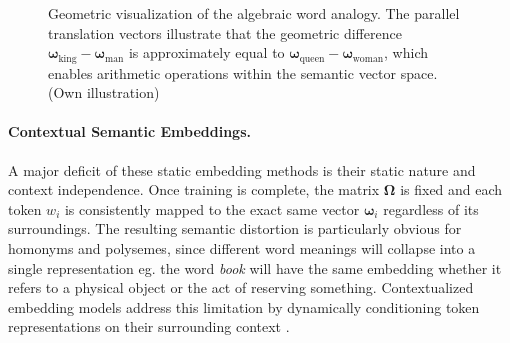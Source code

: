 \begin{figure}[htpb]
    \caption[Geometric visualization of word vector algebra.]{Geometric visualization of the algebraic word analogy. The parallel translation vectors illustrate that the geometric difference $\boldsymbol{\omega}_{\text{king}} - \boldsymbol{\omega}_{\text{man}}$ is approximately equal to $\boldsymbol{\omega}_{\text{queen}} - \boldsymbol{\omega}_{\text{woman}}$, which enables arithmetic operations within the semantic vector space. (Own illustration)}
    \label{fig:embedding_analogy}
\end{figure}



\paragraph{Contextual Semantic Embeddings.}
\label{sec:contextual_embeddings}

A major deficit of these static embedding methods is their static nature and context independence. Once training is complete, the matrix $\mathbf{\Omega}$ is fixed and each token $w_i$ is consistently mapped to the exact same vector $\boldsymbol{\omega}_i$ regardless of its surroundings. The resulting semantic distortion is particularly obvious for homonyms and polysemes, since different word meanings will collapse into a single representation \cite{ethayarajh-2019-contextual}\cite[p. 174 f.]{Jurafsky2024_SLP} eg. the word \emph{book} will have the same embedding whether it refers to a physical object or the act of reserving something. Contextualized embedding models address this limitation by dynamically conditioning token representations on their surrounding context \cite[p.~174~f.]{Jurafsky2024_SLP}\cite{peters_2018_deep}.

